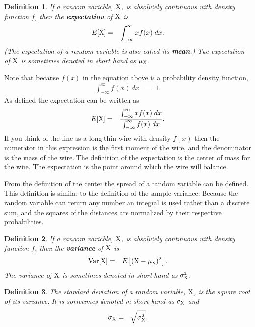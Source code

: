 \documentclass[12pt]{article}
\newtheorem{definition}{Definition}[section]
\begin{document}
\begin{definition}
  If a random variable, ${\rm X}$, is absolutely continuous with
  density function $f$, then the \textbf{expectation} of ${\rm X}$ is
  \begin{eqnarray*}
    E[{\rm X}] & = & \int^\infty_{-\infty} x f(x)~dx.
  \end{eqnarray*}
  (The expectation of a random variable is also called its
  \textbf{mean}.)  The expectation of ${\rm X}$ is sometimes denoted
  in short hand as $\mu_{\rm X}$.
\end{definition}

Note that because $f(x)$ in the equation above is a probability
density function,
\begin{eqnarray*}
  \int^\infty_{-\infty} f(x)~dx & = & 1.
\end{eqnarray*}
As defined the expectation can be written as 
\begin{eqnarray*}
  E[{\rm X}] & = & \frac{\int^\infty_{-\infty} x f(x)~dx}{\int^\infty_{-\infty} f(x)~dx}.
\end{eqnarray*}
If you think of the line as a long thin wire with density $f(x)$ then
the numerator in this expression is the first moment of the wire, and
the denominator is the mass of the wire. The definition of the
expectation is the center of mass for the wire. The expectation is the
point around which the wire will balance.

From the definition of the center the spread of a random variable can
be defined. This definition is similar to the definition of the sample
variance. Because the random variable can return any number an
integral is used rather than a discrete sum, and the squares of the
distances are normalized by their respective probabilities.

\begin{definition}
  If a random variable, ${\rm X}$, is absolutely continuous with
  density function $f$, then the \textbf{variance} of ${\rm X}$ is
  \begin{eqnarray*}
    \mathrm{Var}[{\rm X}] & = & E\left[ ({\rm X}-\mu_{\rm X})^2 \right].
  \end{eqnarray*}
  The variance of ${\rm X}$ is sometimes denoted in short hand as
  $\sigma^2_{\rm X}$.
\end{definition}

\begin{definition}
  The standard deviation of a random variable, ${\rm X}$, is the
  square root of its variance. It is sometimes denoted in short
  hand as $\sigma_{\rm X}$ and
  \begin{eqnarray*}
    \sigma_{\rm X} & = & \sqrt{\sigma_{\rm X}^2}.
  \end{eqnarray*}
\end{definition}
\end{document}
